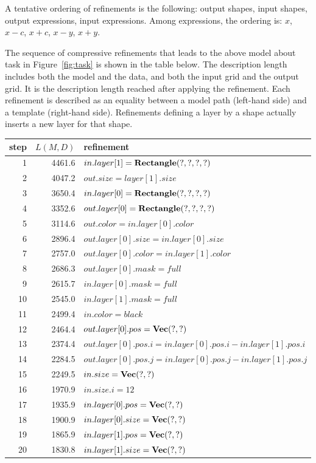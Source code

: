 \documentclass[a4paper]{llncs}
\begin{document}
A tentative ordering of refinements is the following: output shapes,
input shapes, output expressions, input expressions.  Among
expressions, the ordering is: $x$, $x-c$, $x+c$, $x-y$, $x+y$.

The sequence of compressive refinements that leads to the above model
about task in Figure~\ref{fig:task} is shown in the table below. The
description length includes both the model and the data, and both the
input grid and the output grid. It is the description length reached
after applying the refinement. Each refinement is described as an
equality between a model path (left-hand side) and a template
(right-hand side). Refinements defining a layer by a shape actually
inserts a new layer for that shape.

\begin{center}
  \begin{tabular}{|r|r|l|}
    \hline
    step & $L(M,D)$ & refinement \\
    \hline
    1 & 4461.6 & $in.layer[1] = {\bf Rectangle}(?,?,?,?)$ \\
    2 & 4047.2 & $out.size = layer[1].size$ \\
    3 & 3650.4 & $in.layer[0] = {\bf Rectangle}(?,?,?,?)$ \\
    4 & 3352.6 & $out.layer[0] = {\bf Rectangle}(?,?,?,?)$ \\
    5 & 3114.6 & $out.color = in.layer[0].color$ \\
    6 & 2896.4 & $out.layer[0].size = in.layer[0].size$ \\
    7 & 2757.0 & $out.layer[0].color = in.layer[1].color$ \\
    8 & 2686.3 & $out.layer[0].mask = full$ \\
    9 & 2615.7 & $in.layer[0].mask = full$ \\
    10 & 2545.0 & $in.layer[1].mask = full$ \\
    11 & 2499.4 & $in.color = black$ \\
    12 & 2464.4	& $out.layer[0].pos = {\bf Vec}(?,?)$ \\
    13 & 2374.4	& $out.layer[0].pos.i = in.layer[0].pos.i - in.layer[1].pos.i$ \\
    14 & 2284.5	& $out.layer[0].pos.j = in.layer[0].pos.j - in.layer[1].pos.j$ \\
    15 & 2249.5	& $in.size = {\bf Vec}(?,?)$ \\
    16 & 1970.9	& $in.size.i=12$ \\
    17 & 1935.9	& $in.layer[0].pos = {\bf Vec}(?,?)$ \\
    18 & 1900.9	& $in.layer[0].size = {\bf Vec}(?,?)$ \\
    19 & 1865.9	& $in.layer[1].pos = {\bf Vec}(?,?)$ \\
    20 & 1830.8	& $in.layer[1].size = {\bf Vec}(?,?)$ \\
    \hline
  \end{tabular}
\end{center}
\end{document}
